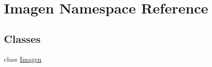 \hypertarget{namespace_imagen}{}\section{Imagen Namespace Reference}
\label{namespace_imagen}
\subsection*{Classes}
\begin{DoxyCompactItemize}
\item 
class \mbox{\hyperlink{class_imagen_1_1_imagen}{Imagen}}
\end{DoxyCompactItemize}
